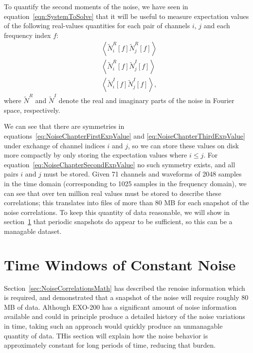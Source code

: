 To quantify the second moments of the noise, we have seen in equation~\ref{eqn:SystemToSolve} that it will be useful to measure expectation values of the following real-values quantities for each pair of channels $i$, $j$ and each frequency index $f$:
\begin{subequations}\begin{align}
&\left<\widetilde{N}^R_i[f]\widetilde{N}^R_j[f]\right>\label{eq:NoiseChapterFirstExpValue}\\
&\left<\widetilde{N}^R_i[f]\widetilde{N}^I_j[f]\right>\label{eq:NoiseChapterSecondExpValue}\\
&\left<\widetilde{N}^I_i[f]\widetilde{N}^I_j[f]\right>\label{eq:NoiseChapterThirdExpValue},
\end{align}\end{subequations}
where $\widetilde{N}^R$ and $\widetilde{N}^I$ denote the real and imaginary parts of the noise in Fourier space, respectively.

We can see that there are symmetries in equations~\ref{eq:NoiseChapterFirstExpValue} and \ref{eq:NoiseChapterThirdExpValue} under exchange of channel indices $i$ and $j$, so we can store these values on disk more compactly by only storing the expectation values where $i \leq j$.  For equation~\ref{eq:NoiseChapterSecondExpValue} no such symmetry exists, and all pairs $i$ and $j$ must be stored.  Given 71 channels and waveforms of 2048 samples in the time domain (corresponding to 1025 samples in the frequency domain), we can see that over ten million real values must be stored to describe these correlations; this translates into files of more than 80 MB for each snapshot of the noise correlations.  To keep this quantity of data reasonable, we will show in section~\ref{sec:NoiseCorrelationsTimeWindows} that periodic snapshots do appear to be sufficient, so this can be a managable dataset.

\section{Time Windows of Constant Noise}\label{sec:NoiseCorrelationsTimeWindows}

Section~\ref{sec:NoiseCorrelationsMath} has described the renoise information which is required, and demonstrated that a snapshot of the noise will require roughly 80 MB of data.  Although EXO-200 has a significant amount of noise information available and could in principle produce a detailed history of the noise variations in time, taking such an approach would quickly produce an unmanagable quantity of data.  THis section will explain how the noise behavior is approximately constant for long periods of time, reducing that burden.

